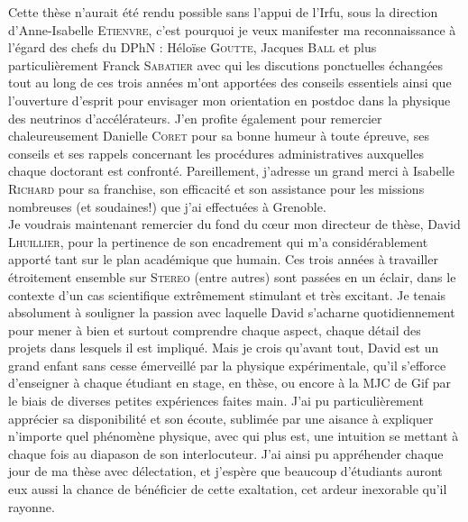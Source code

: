 Cette thèse n'aurait été rendu possible sans l'appui de l'Irfu, sous la direction d'Anne-Isabelle \textsc{Etienvre}, c'est pourquoi je veux manifester ma reconnaissance à l'égard des chefs du DPhN : Héloïse \textsc{Goutte}, Jacques \textsc{Ball} et plus particulièrement Franck \textsc{Sabatier} avec qui les discutions ponctuelles échangées tout au long de ces trois années m'ont apportées des conseils essentiels ainsi que l'ouverture d'esprit pour envisager mon orientation en postdoc dans la physique des neutrinos d'accélérateurs. J'en profite également pour remercier chaleureusement Danielle \textsc{Coret} pour sa bonne humeur à toute épreuve, ses conseils et ses rappels concernant les procédures administratives auxquelles chaque doctorant est confronté. Pareillement, j'adresse un grand merci à Isabelle \textsc{Richard} pour sa franchise, son efficacité et son assistance pour les missions nombreuses (et soudaines!) que j'ai effectuées à Grenoble.\\

Je voudrais maintenant remercier du fond du c\oe ur mon directeur de thèse, David \textsc{Lhuillier}, pour la pertinence de son encadrement qui m'a considérablement apporté tant sur le plan académique que humain. Ces trois années à travailler étroitement ensemble sur \textsc{Stereo} (entre autres) sont passées en un éclair, dans le contexte d'un cas scientifique extrêmement stimulant et très excitant. Je tenais absolument à souligner la passion avec laquelle David s'acharne quotidiennement pour mener à bien et surtout comprendre chaque aspect, chaque détail des projets dans lesquels il est impliqué. Mais je crois qu'avant tout, David est un grand enfant sans cesse émerveillé par la physique expérimentale, qu'il s'efforce d'enseigner à chaque étudiant en stage, en thèse, ou encore à la MJC de Gif par le biais de diverses petites expériences faites main. J'ai pu particulièrement apprécier sa disponibilité et son écoute, sublimée par une aisance à expliquer n'importe quel phénomène physique, avec qui plus est, une intuition se mettant à chaque fois au diapason de son interlocuteur. J'ai ainsi pu appréhender chaque jour de ma thèse avec délectation, et j'espère que beaucoup d'étudiants auront eux aussi la chance de bénéficier de cette exaltation, cet ardeur inexorable qu'il rayonne.\\

